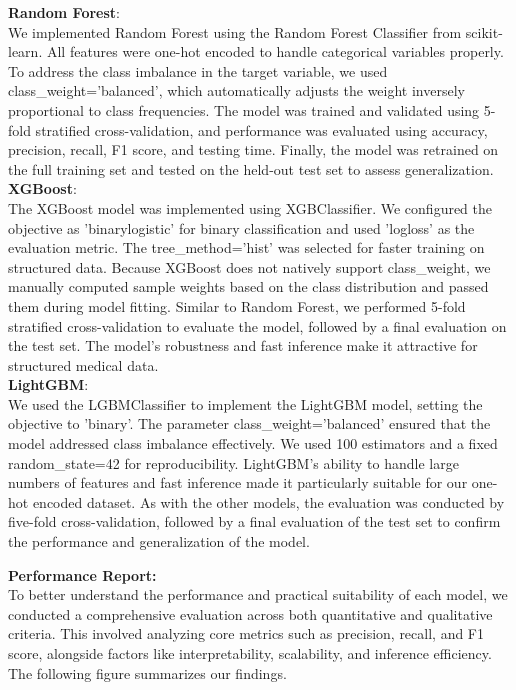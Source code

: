 \documentclass[conference]{IEEEtran}
\begin{document}
\noindent
\textbf{Random Forest}:\\
We implemented Random Forest using the Random Forest Classifier from scikit-learn. All features were one-hot encoded to handle categorical variables properly. To address the class imbalance in the target variable, we used class\_weight='balanced', which automatically adjusts the weight inversely proportional to class frequencies. The model was trained and validated using 5-fold stratified cross-validation, and performance was evaluated using accuracy, precision, recall, F1 score, and testing time. Finally, the model was retrained on the full training set and tested on the held-out test set to assess generalization.\\

\noindent
\textbf{XGBoost}:\\
The XGBoost model was implemented using XGBClassifier. We configured the objective as 'binary\:logistic' for binary classification and used 'logloss' as the evaluation metric. The tree\_method='hist' was selected for faster training on structured data. Because XGBoost does not natively support class\_weight, we manually computed sample weights based on the class distribution and passed them during model fitting. Similar to Random Forest, we performed 5-fold stratified cross-validation to evaluate the model, followed by a final evaluation on the test set. The model's robustness and fast inference make it attractive for structured medical data.\\

\noindent
\textbf{LightGBM}:\\
We used the LGBMClassifier to implement the LightGBM model, setting the objective to 'binary'. The parameter class\_weight='balanced' ensured that the model addressed class imbalance effectively. We used 100 estimators and a fixed random\_state=42 for reproducibility. LightGBM’s ability to handle large numbers of features and fast inference made it particularly suitable for our one-hot encoded dataset. As with the other models, the evaluation was conducted by five-fold cross-validation, followed by a final evaluation of the test set to confirm the performance and generalization of the model.

\vspace{2em}

\noindent \textbf{Performance Report:}\\
To better understand the performance and practical suitability of each model, we conducted a comprehensive evaluation across both quantitative and qualitative criteria. This involved analyzing core metrics such as precision, recall, and F1 score, alongside factors like interpretability, scalability, and inference efficiency. The following figure summarizes our findings.
\end{document}
